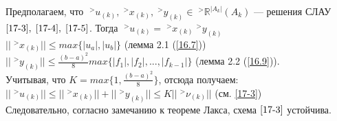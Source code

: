 \documentclass[__main__.tex]{subfiles}
\begin{document}
Предполагаем, что $\;^>u_{(k)}, \;^>x_{(k)}, \;^>y_{(k)} \in \;^>\mathbb{R}^{|A_k|}(A_k)$ — решения СЛАУ $\ref{17-3}, \; \ref{17-4}, \; \ref{17-5}$. Тогда $\;^>u_{(k)} = \;^>x_{(k)} \;^>y_{(k)}$\\
$||\;^>x_{(k)}|| \le max\{|u_a|, |u_b|\}$ (лемма 2.1 (\ref{16.7}))\\
$||\;^>y_{(k)}|| \le \frac{(b-a)^2}{8} max\{|f_1|, |f_2|, ..., |f_{k-1}|\}$ (лемма 2.2 (\ref{16.9})).\\
Учитывая, что $K = max\{1, \frac{(b-a)^2}{8}\}$, отсюда получаем:\\
$||\;^>u_{(k)}|| \le ||\;^>x_{(k)}|| + ||\;^>y_{(k)}|| \le K ||\;^>\nu_{(k)}||$ (см. \ref{17-3})\\
Следовательно, согласно замечанию к теореме Лакса, схема $\ref{17-3}$ устойчива.
\end{document}
